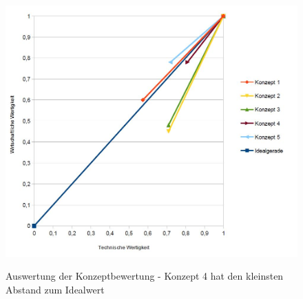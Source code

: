 \begin{figure}[H]
        \myfloatalign
        {\includegraphics[width=.8\linewidth]{gfx/conclusion/s_diagram.jpg}} \quad
        \caption[Auswertung der Konzeptbewertung - Konzept 4 hat den kleinsten Abstand zum Idealwert]
        {Auswertung der Konzeptbewertung - Konzept 4 hat den kleinsten Abstand zum Idealwert}
        \label{fig:TabEvalOne}
\end{figure}
